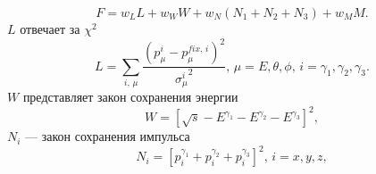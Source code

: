 \begin{equation}
F = w_L L + w_W W + w_N \left( N_1 + N_2 + N_3 \right) + w_M M.
\end{equation}
$L$ отвечает за $\chi^{2}$
\begin{equation}
	L
	= 
	\sum_{i, \, \mu} 
	\frac{ \left( p^{i}_\mu -p^{fix,\,i}_\mu \right)^2 }{{\sigma^i_\mu}^2} , 
	\, \mu = E, \theta, \phi, \, i = \gamma_1, \gamma_2, \gamma_3.
\end{equation}
$W$ представляет закон сохранения энергии
\begin{equation}
	W = \left[ \sqrt{s} - E^{\gamma_1}- E^{\gamma_2}- E^{\gamma_3} \right]^2 ,
\end{equation}
$N_i$ --- закон сохранения импульса
\begin{equation}
	N_i = \left[ p_i^{\gamma_1} + p_i^{\gamma_2} + p_i^{\gamma_3} \right]^2, \, i=x,y,z ,
\end{equation}

